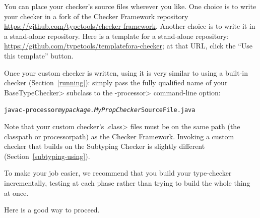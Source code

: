 
You can place your checker's source files wherever you like.
One choice is to write your checker in a fork of the Checker Framework
repository \url{https://github.com/typetools/checker-framework}.
Another choice is to write it in a stand-alone repository.  Here is a
template for a stand-alone repository:
\url{https://github.com/typetools/templatefora-checker}; at that URL,
click the ``Use this template'' button.


Once your custom checker is written, using it is very similar to using a
built-in checker (Section~\ref{running}):
simply pass the fully qualified name of your \<BaseTypeChecker>
subclass to the \<-processor> command-line option:
\begin{alltt}
  javac -processor \textit{mypackage.MyPropChecker} SourceFile.java
\end{alltt}
Note that your custom checker's
\<.class> files must be on the same path (the classpath or processorpath)
as the Checker Framework.
Invoking a custom checker that builds on
the Subtyping Checker is slightly different (Section~\ref{subtyping-using}).




To make your job easier, we recommend that you build your type-checker
incrementally, testing at each phase rather than trying to build the whole
thing at once.

Here is a good way to proceed.

